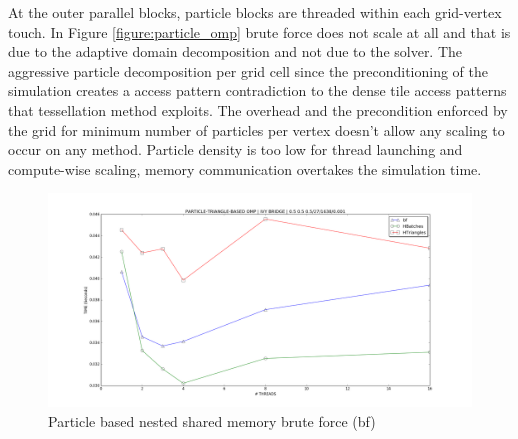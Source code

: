 At the outer parallel blocks, particle blocks are threaded within each grid-vertex touch. In Figure \ref{figure:particle_omp} brute force does not scale at all and that is due to the adaptive domain decomposition and not due to the solver. The aggressive particle decomposition per grid cell since the preconditioning of the simulation creates a access pattern contradiction to the dense tile access patterns that tessellation method exploits. The overhead and the precondition enforced by the grid for minimum number of particles per vertex doesn't allow any scaling to occur on any method. Particle density is too low for thread launching and compute-wise scaling, memory communication overtakes the simulation time. 

\begin{figure}[htb]
  \begin{center}
    \includegraphics[width=1\textwidth]{experiments/random/omp/particle_triangle_based_x0.png}
  \end{center}
  \caption{Particle based nested shared memory brute force (bf)}
  \label{figure:particletriangle_omp}
\end{figure}





